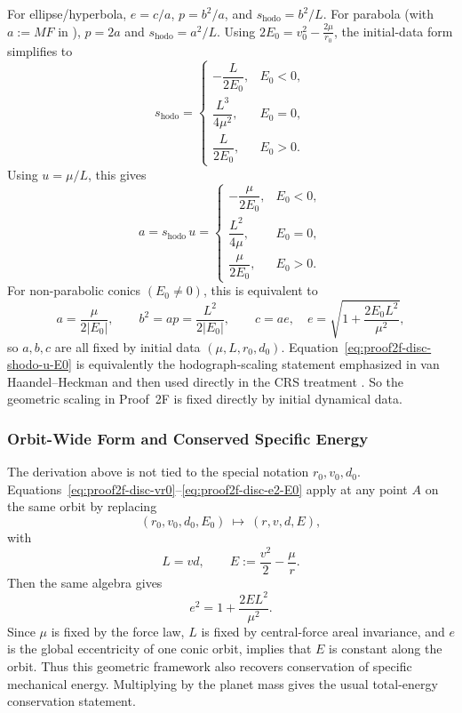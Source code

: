For ellipse/hyperbola, \(e=c/a\), \(p=b^2/a\), and \(s_{\mathrm{hodo}}=b^2/L\). For parabola (with \(a:=MF\) in ), \(p=2a\) and \(s_{\mathrm{hodo}}=a^2/L\). Using \(2E_0=v_0^2-\frac{2\mu}{r_0}\), the initial-data form simplifies to
\begin{equation}
  s_{\mathrm{hodo}}
  =
  \begin{cases}
    -\dfrac{L}{2E_0}, & E_0<0,\\[8pt]
    \dfrac{L^3}{4\mu^2}, & E_0=0,\\[8pt]
    \dfrac{L}{2E_0}, & E_0>0.
  \end{cases}
\label{eq:proof2f-disc-shodo-E0}
\end{equation}
Using \(u=\mu/L\), this gives
\begin{equation}
  a=s_{\mathrm{hodo}}\,u
  =
  \begin{cases}
    -\dfrac{\mu}{2E_0}, & E_0<0,\\[8pt]
    \dfrac{L^2}{4\mu}, & E_0=0,\\[8pt]
    \dfrac{\mu}{2E_0}, & E_0>0.
  \end{cases}
\label{eq:proof2f-disc-shodo-u-E0}
\end{equation}
For non-parabolic conics \((E_0\neq 0)\), this is equivalent to
\begin{equation}
  a=\frac{\mu}{2|E_0|},
  \qquad
  b^2=ap=\frac{L^2}{2|E_0|},
  \qquad
  c=ae,\quad
  e=\sqrt{1+\frac{2E_0L^2}{\mu^2}},
\label{eq:proof2f-disc-abc-from-initial}
\end{equation}
so \(a,b,c\) are all fixed by initial data \((\mu,L,r_0,d_0)\).
Equation~\eqref{eq:proof2f-disc-shodo-u-E0} is equivalently the hodograph-scaling statement emphasized in van Haandel--Heckman and then used directly in the CRS treatment \cite{vanhaandelheckman2009teaching,carinena2016newlook}.
So the geometric scaling in Proof~2F is fixed directly by initial dynamical data.

\subsubsection{Orbit-Wide Form and Conserved Specific Energy}

The derivation above is not tied to the special notation \(r_0,v_0,d_0\). Equations~\eqref{eq:proof2f-disc-vr0}--\eqref{eq:proof2f-disc-e2-E0} apply at any point \(A\) on the same orbit by replacing
\[
  (r_0,v_0,d_0,E_0)\ \mapsto\ (r,v,d,E),
\]
with
\[
  L=vd,\qquad E:=\frac{v^2}{2}-\frac{\mu}{r}.
\]
Then the same algebra gives
\begin{equation}
  e^2=1+\frac{2EL^2}{\mu^2}.
\label{eq:proof2f-disc-e2-E}
\end{equation}
Since \(\mu\) is fixed by the force law, \(L\) is fixed by central-force areal invariance, and \(e\) is the global eccentricity of one conic orbit,  implies that \(E\) is constant along the orbit. Thus this geometric framework also recovers conservation of specific mechanical energy. Multiplying by the planet mass gives the usual total-energy conservation statement.

